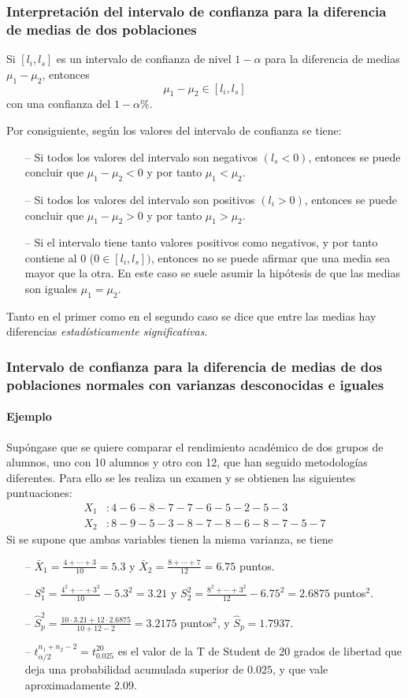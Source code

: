 \begin{frame}
\frametitle{Interpretación del intervalo de confianza para la diferencia de medias de dos poblaciones}
Si $[l_i,l_s]$ es un intervalo de confianza de nivel $1-\alpha$ para la diferencia de medias $\mu_1-\mu_2$, entonces
\[
\mu_1-\mu_2 \in [l_i,l_s]
\]
con una confianza del $1-\alpha\%$.

Por consiguiente, según los valores del intervalo de confianza se tiene:
\begin{itemize}
\item[--] Si todos los valores del intervalo son negativos $(l_s<0)$, entonces se puede concluir que $\mu_1-\mu_2<0$ y
por tanto $\mu_1<\mu_2$.
\item[--] Si todos los valores del intervalo son positivos $(l_i>0)$, entonces se puede concluir que $\mu_1-\mu_2>0$ y
por tanto $\mu_1>\mu_2$.
\item[--] Si el intervalo tiene tanto valores positivos como negativos, y por tanto contiene al 0 ($0\in [l_i,l_s])$,
entonces no se puede afirmar que una media sea mayor que la otra. En este caso se suele asumir la hipótesis de que las medias son iguales $\mu_1=\mu_2$.
\end{itemize}
Tanto en el primer como en el segundo caso se dice que entre las medias hay diferencias \emph{estadísticamente significativas}.
\end{frame}


\begin{frame}
\frametitle{Intervalo de confianza para la diferencia de medias de dos poblaciones normales con varianzas desconocidas
e iguales}
\framesubtitle{Ejemplo}
Supóngase que se quiere comparar el rendimiento académico de dos grupos de alumnos, uno con 10 alumnos y otro con 12, que han seguido metodologías diferentes.
Para ello se les realiza un examen y se obtienen las siguientes puntuaciones:
\begin{align*}
X_1 &: 4 - 6 - 8 - 7 - 7 - 6 - 5 - 2 - 5 - 3 \\
X_2 &: 8 - 9 - 5 - 3 - 8 - 7 - 8 - 6 - 8 - 7 - 5 - 7  
\end{align*}
Si se supone que ambas variables tienen la misma varianza, se tiene
\begin{itemize}
\item[--] $\bar{X}_1 = \frac{4+\cdots +3}{10}=5.3$ y $\bar{X}_2=\frac{8+\cdots +7}{12}=6.75$ puntos.
\item[--] $S_1^2= \frac{4^2+\cdots + 3^2}{10}-5.3^2=3.21$ y $S_2^2= \frac{8^2+\cdots
+3^2}{12}-6.75^2=2.6875$ puntos$^2$.
\item[--] $\hat{S}_p^2 = \frac{10\cdot 3.21+12\cdot 2.6875}{10+12-2}= 3.2175$ puntos$^2$, y $\hat S_p=1.7937$.
\item[--] $t^{n_1+n_2-2}_{\alpha/2}=t^{20}_{0.025}$ es el valor de la T de Student de 20 grados de libertad que deja una probabilidad acumulada superior de $0.025$, y que vale aproximadamente $2.09$. 
\end{itemize}
\end{frame}


